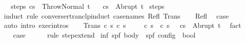 \begin{isabellebody}
\ \ \ steps{\isacharcolon}\ {\isachardoublequoteopen}{\isasymGamma}{\isasymturnstile}{\isacharparenleft}c{\isacharcomma}s{\isacharparenright}\ {\isasymrightarrow}\isactrlsup {\isacharasterisk}\ {\isacharparenleft}Throw{\isacharcomma}Normal\ t{\isacharparenright}{\isachardoublequoteclose}\isanewline
\ \ \ {\isachardoublequoteopen}{\isasymGamma}{\isasymturnstile}{\isasymlangle}c{\isacharcomma}s{\isasymrangle}\ {\isasymRightarrow}\ Abrupt\ t{\isachardoublequoteclose}\isanewline
%
\isadelimproof
%
\endisadelimproof
%
\isatagproof
{}\isamarkupfalse%
\ steps\isanewline
{}\isamarkupfalse%
\ {\isacharparenleft}induct\ rule{\isacharcolon}\ converse{\isacharunderscore}rtranclp{\isacharunderscore}induct{}\ {\isacharbrackleft}case{\isacharunderscore}names\ Refl\ Trans{\isacharbrackright}{\isacharparenright}\isanewline
\ \ \isamarkupfalse%
\ Refl\ \isamarkupfalse%
\ {\isacharquery}case\isanewline
\ \ \ \ \isamarkupfalse%
\ {\isacharparenleft}auto\ intro{\isacharcolon}\ exec{\isachardot}intros{\isacharparenright}\isanewline
{}\isamarkupfalse%
\isanewline
\ \ \isamarkupfalse%
\ {\isacharparenleft}Trans\ c\ s\ c{\isacharprime}\ s{\isacharprime}{\isacharparenright}\isanewline
\ \ \isamarkupfalse%
\ {\isachardoublequoteopen}{\isasymGamma}{\isasymturnstile}\ {\isacharparenleft}c{\isacharcomma}\ s{\isacharparenright}\ {\isasymrightarrow}\ {\isacharparenleft}c{\isacharprime}{\isacharcomma}\ s{\isacharprime}{\isacharparenright}{\isachardoublequoteclose}\ \ {\isachardoublequoteopen}{\isasymGamma}{\isasymturnstile}\ {\isasymlangle}c{\isacharprime}{\isacharcomma}s{\isacharprime}{\isasymrangle}\ {\isasymRightarrow}\ Abrupt\ t{\isachardoublequoteclose}\ \isamarkupfalse%
\ fact{\isacharplus}\isanewline
\ \ \isamarkupfalse%
\ {\isacharquery}case\isanewline
\ \ \ \ \isamarkupfalse%
\ {\isacharparenleft}rule\ step{\isacharunderscore}extend{\isacharparenright}\isanewline
{}\isamarkupfalse%
%
\endisatagproof
{\isafoldproof}%
%
\isadelimproof
%
\endisadelimproof
%
\isamarkuptrue%
\isamarkupfalse%
\ inf{\isacharcolon}{\isacharcolon}\ {\isachardoublequoteopen}{\isacharparenleft}{\isacharprime}s{\isacharcomma}{\isacharprime}p{\isacharcomma}{\isacharprime}f{\isacharparenright}\ body\ {\isasymRightarrow}\ {\isacharparenleft}{\isacharprime}s{\isacharcomma}{\isacharprime}p{\isacharcomma}{\isacharprime}f{\isacharparenright}\ config\ {\isasymRightarrow}\ bool{\isachardoublequoteclose}\isanewline

\end{isabellebody}
